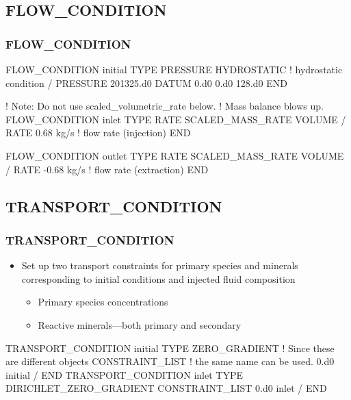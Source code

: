 \documentclass{beamer}
\newcommand\bluecomment[1]{{{\color{blue} #1}}}
\newcommand\greencomment[1]{{{\color{green} #1}}}
\begin{document}
\subsection{FLOW\_CONDITION}

\begin{frame}\frametitle{\bf FLOW\_CONDITION}

\begin{semiverbatim}
FLOW_CONDITION initial
  TYPE
    PRESSURE HYDROSTATIC \bluecomment{! hydrostatic condition}
  /
  PRESSURE 201325.d0
  DATUM 0.d0 0.d0 128.d0
END

\newpage
! Note: Do not use scaled_volumetric_rate below.
!       Mass balance blows up.
FLOW_CONDITION inlet
  TYPE
    RATE SCALED_MASS_RATE VOLUME
  /
  RATE 0.68 kg/s \bluecomment{! flow rate (injection)}
END

FLOW_CONDITION outlet
  TYPE
    RATE SCALED_MASS_RATE VOLUME
  /
  RATE -0.68 kg/s \bluecomment{! flow rate (extraction)}
END

\end{semiverbatim}
\end{frame}

\subsection{TRANSPORT\_CONDITION}

\begin{frame}[fragile]\frametitle{\bf TRANSPORT\_CONDITION}
\vspace{-1mm}
\begin{itemize}
  \item Set up two transport constraints for primary species and minerals corresponding to initial conditions and injected fluid composition
   \begin{itemize}
     \item Primary species concentrations
     \item Reactive minerals---both primary and secondary
   \end{itemize}
\end{itemize}
\vspace{-3mm}
\begin{semiverbatim}
TRANSPORT_CONDITION \greencomment{initial} 
  TYPE ZERO_GRADIENT  \bluecomment{! Since these are different objects}
  CONSTRAINT_LIST     \bluecomment{!   the same name can be used.}
    0.d0 \greencomment{initial}
  /
END
\vspace{-3mm}
TRANSPORT_CONDITION \greencomment{inlet}
  TYPE DIRICHLET_ZERO_GRADIENT
  CONSTRAINT_LIST
    0.d0 \greencomment{inlet}
  /
END
\end{semiverbatim}
\end{frame}
\end{document}
